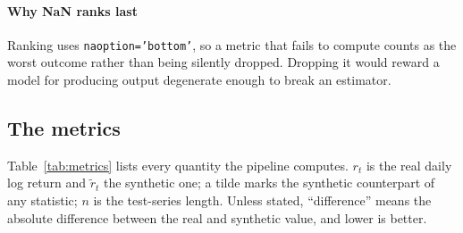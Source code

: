 \documentclass[11pt,a4paper]{article}
\makeatletter
\DeclareRobustCommand{\_}{\ifmmode\nfss@text{\textunderscore}\else\textunderscore\allowbreak\fi}
\makeatother
\begin{document}
\paragraph{Why NaN ranks last} Ranking uses \texttt{na\_option='bottom'}, so a metric that fails to compute counts as the worst outcome rather than being silently dropped. Dropping it would reward a model for producing output degenerate enough to break an estimator.

\subsection{The metrics}
\label{sec:metrics}
Table~\ref{tab:metrics} lists every quantity the pipeline computes. $r_t$ is the real daily log return and $\tilde r_t$ the synthetic one; a tilde marks the synthetic counterpart of any statistic; $n$ is the test-series length. Unless stated, ``difference'' means the absolute difference between the real and synthetic value, and lower is better.
\end{document}
